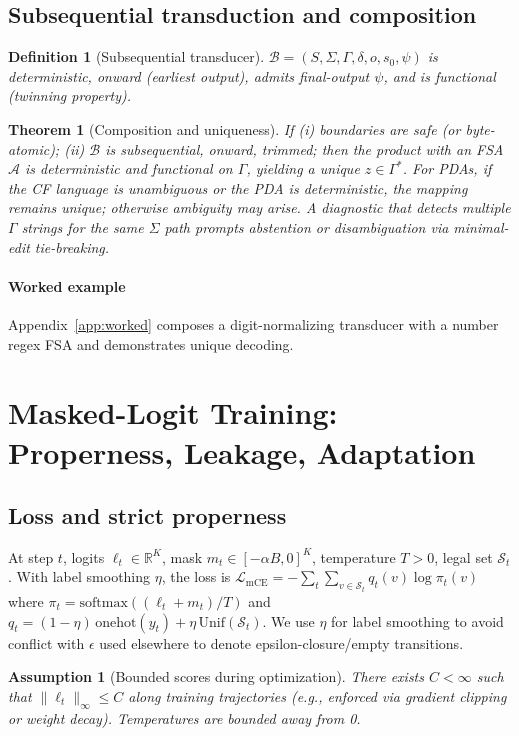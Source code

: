 \documentclass{article}
\newtheorem{assumption}{Assumption}
\newtheorem{definition}{Definition}
\newtheorem{theorem}{Theorem}
\begin{document}
\subsection{Subsequential transduction and composition}\label{sec:transducer}
\begin{definition}[Subsequential transducer]
$\mathcal{B}=(S,\Sigma,\Gamma,\delta,o,s_0,\psi)$ is deterministic, onward (earliest output), admits final-output $\psi$, and is functional (twinning property).
\end{definition}

\begin{theorem}[Composition and uniqueness]\label{thm:comp}
If (i) boundaries are safe (or byte-atomic); (ii) $\mathcal{B}$ is subsequential, onward, trimmed; then the product with an FSA $\mathcal{A}$ is deterministic and functional on $\Gamma$, yielding a unique $z\in\Gamma^\ast$. For PDAs, if the CF language is unambiguous or the PDA is deterministic, the mapping remains unique; otherwise ambiguity may arise. A diagnostic that detects multiple $\Gamma$ strings for the same $\Sigma$ path prompts abstention or disambiguation via minimal-edit tie-breaking.
\end{theorem}

\paragraph{Worked example}
Appendix~\ref{app:worked} composes a digit-normalizing transducer with a number regex FSA and demonstrates unique decoding.

\section{Masked-Logit Training: Properness, Leakage, Adaptation}
\subsection{Loss and strict properness}
At step $t$, logits $\ell_t\in\mathbb{R}^K$, mask $m_t\in[-\alpha B,0]^K$, temperature $T>0$, legal set $\mathcal{S}_t$. With label smoothing $\eta$, the loss is
$\mathcal{L}_{\mathrm{mCE}}=-\sum_t \sum_{v\in\mathcal{S}_t} q_t(v) \log \pi_t(v)$
where $\pi_t=\mathrm{softmax}((\ell_t+m_t)/T)$ and $q_t=(1-\eta)\,\mathrm{onehot}(y_t)+\eta\,\mathrm{Unif}(\mathcal{S}_t)$. We use $\eta$ for label smoothing to avoid conflict with $\epsilon$ used elsewhere to denote epsilon-closure/empty transitions.

\begin{assumption}[Bounded scores during optimization]\label{assump:bounded}
There exists $C<\infty$ such that $\|\ell_t\|_\infty\le C$ along training trajectories (e.g., enforced via gradient clipping or weight decay). Temperatures are bounded away from 0.
\end{assumption}
\end{document}
